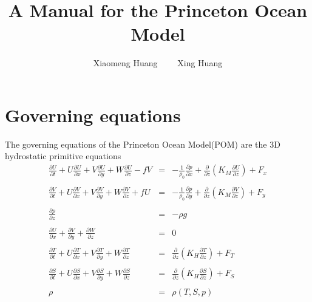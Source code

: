 \documentclass[oribibl]{llncs}
\begin{document}
\title{A Manual for the Princeton Ocean Model}
\author{Xiaomeng Huang \ \ \ \  Xing Huang}
\maketitle

\section{Governing equations}

The governing equations of the Princeton Ocean Model(POM) are the 3D hydrostatic primitive equations
\begin{eqnarray}
\frac{\partial U}{\partial t}+U\frac{\partial U}{\partial x}+V\frac{\partial U}{\partial y}+W\frac{\partial U}{\partial z} -fV &=& - \frac{1}{\rho_0} \frac{\partial p}{\partial x} + \frac{\partial}{\partial z}  \left ( K_M \frac{\partial U}{\partial z} \right) +F_x\\ \nonumber \\ 
\frac{\partial V}{\partial t}+U\frac{\partial V}{\partial x}+V\frac{\partial V}{\partial y}+W\frac{\partial V}{\partial z} +fU&=& - \frac{1}{\rho_0} \frac{\partial p}{\partial y} + \frac{\partial}{\partial z}  \left ( K_M \frac{\partial V}{\partial z} \right) +F_y\\ \nonumber \\ 
\frac{\partial p}{\partial z} &=& - \rho g \\ \nonumber \\ 
\frac{\partial U}{\partial x} + \frac{\partial V}{\partial y} + \frac{\partial W}{\partial z} &=& 0 \\ \nonumber \\ 
\frac{\partial T}{\partial t}+U\frac{\partial T}{\partial x}+V\frac{\partial T}{\partial y}+W\frac{\partial T}{\partial z} &=& \frac{\partial}{\partial z}  \left ( K_H \frac{\partial T}{\partial z} \right) +F_T \\ \nonumber \\ 
\frac{\partial S}{\partial t}+U\frac{\partial S}{\partial x}+V\frac{\partial S}{\partial y}+W\frac{\partial S}{\partial z} &=& \frac{\partial}{\partial z}  \left ( K_H \frac{\partial S}{\partial z} \right) +F_S\\ \nonumber \\ 
\rho &=& \rho(T,S,p)
\end{eqnarray}
\end{document}
